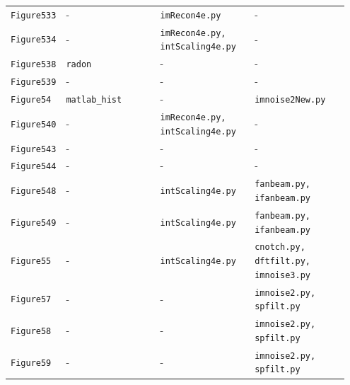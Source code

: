 \documentclass[10pt]{article}
\begin{document}
\begin{longtable}{p{0.11\linewidth} p{0.28\linewidth} p{0.28\linewidth} p{0.28\linewidth}}
\texttt{Figure533} & - & \texttt{imRecon4e.py} & - \\
\texttt{Figure534} & - & \texttt{imRecon4e.py, intScaling4e.py} & - \\
\texttt{Figure538} & \texttt{radon} & - & - \\
\texttt{Figure539} & - & - & - \\
\texttt{Figure54} & \texttt{matlab\_hist} & - & \texttt{imnoise2New.py} \\
\texttt{Figure540} & - & \texttt{imRecon4e.py, intScaling4e.py} & - \\
\texttt{Figure543} & - & - & - \\
\texttt{Figure544} & - & - & - \\
\texttt{Figure548} & - & \texttt{intScaling4e.py} & \texttt{fanbeam.py, ifanbeam.py} \\
\texttt{Figure549} & - & \texttt{intScaling4e.py} & \texttt{fanbeam.py, ifanbeam.py} \\
\texttt{Figure55} & - & \texttt{intScaling4e.py} & \texttt{cnotch.py, dftfilt.py, imnoise3.py} \\
\texttt{Figure57} & - & - & \texttt{imnoise2.py, spfilt.py} \\
\texttt{Figure58} & - & - & \texttt{imnoise2.py, spfilt.py} \\
\texttt{Figure59} & - & - & \texttt{imnoise2.py, spfilt.py} \\
\end{longtable}
\end{document}
